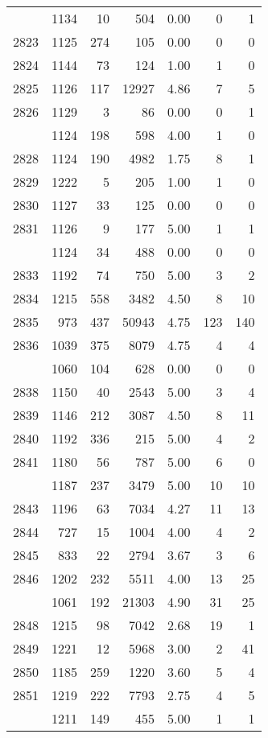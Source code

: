 \documentclass[
]{article}
\begin{document}
\begin{table}
\begin{tabular}[t]{lrrrrrr}
\addlinespace
2822 & 1134 & 10 & 504 & 0.00 & 0 & 1\\
2823 & 1125 & 274 & 105 & 0.00 & 0 & 0\\
2824 & 1144 & 73 & 124 & 1.00 & 1 & 0\\
2825 & 1126 & 117 & 12927 & 4.86 & 7 & 5\\
2826 & 1129 & 3 & 86 & 0.00 & 0 & 1\\
\addlinespace
2827 & 1124 & 198 & 598 & 4.00 & 1 & 0\\
2828 & 1124 & 190 & 4982 & 1.75 & 8 & 1\\
2829 & 1222 & 5 & 205 & 1.00 & 1 & 0\\
2830 & 1127 & 33 & 125 & 0.00 & 0 & 0\\
2831 & 1126 & 9 & 177 & 5.00 & 1 & 1\\
\addlinespace
2832 & 1124 & 34 & 488 & 0.00 & 0 & 0\\
2833 & 1192 & 74 & 750 & 5.00 & 3 & 2\\
2834 & 1215 & 558 & 3482 & 4.50 & 8 & 10\\
2835 & 973 & 437 & 50943 & 4.75 & 123 & 140\\
2836 & 1039 & 375 & 8079 & 4.75 & 4 & 4\\
\addlinespace
2837 & 1060 & 104 & 628 & 0.00 & 0 & 0\\
2838 & 1150 & 40 & 2543 & 5.00 & 3 & 4\\
2839 & 1146 & 212 & 3087 & 4.50 & 8 & 11\\
2840 & 1192 & 336 & 215 & 5.00 & 4 & 2\\
2841 & 1180 & 56 & 787 & 5.00 & 6 & 0\\
\addlinespace
2842 & 1187 & 237 & 3479 & 5.00 & 10 & 10\\
2843 & 1196 & 63 & 7034 & 4.27 & 11 & 13\\
2844 & 727 & 15 & 1004 & 4.00 & 4 & 2\\
2845 & 833 & 22 & 2794 & 3.67 & 3 & 6\\
2846 & 1202 & 232 & 5511 & 4.00 & 13 & 25\\
\addlinespace
2847 & 1061 & 192 & 21303 & 4.90 & 31 & 25\\
2848 & 1215 & 98 & 7042 & 2.68 & 19 & 1\\
2849 & 1221 & 12 & 5968 & 3.00 & 2 & 41\\
2850 & 1185 & 259 & 1220 & 3.60 & 5 & 4\\
2851 & 1219 & 222 & 7793 & 2.75 & 4 & 5\\
\addlinespace
2852 & 1211 & 149 & 455 & 5.00 & 1 & 1\\

\end{tabular}
\end{table}
\end{document}
